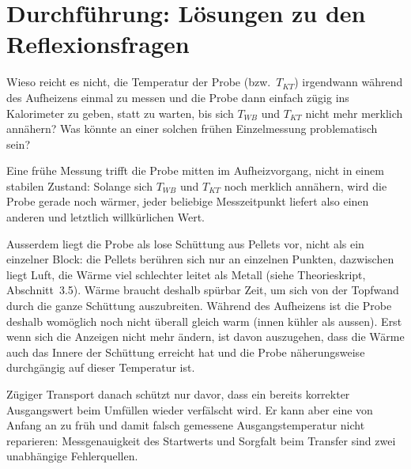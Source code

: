 \documentclass[11pt,a4paper]{article}
\newcommand{\Temp}{T}
\begin{document}
\section{Durchführung: Lösungen zu den Reflexionsfragen}

\begin{aufgabebox}
Wieso reicht es nicht, die Temperatur der Probe (bzw.\ $\Temp_{KT}$) irgendwann während des Aufheizens einmal zu messen und die Probe dann einfach zügig ins Kalorimeter zu geben, statt zu warten, bis sich $\Temp_{WB}$ und $\Temp_{KT}$ nicht mehr merklich annähern? Was könnte an einer solchen frühen Einzelmessung problematisch sein?
\end{aufgabebox}
\begin{loesungbox}
Eine frühe Messung trifft die Probe mitten im Aufheizvorgang, nicht in einem stabilen Zustand: Solange sich $\Temp_{WB}$ und $\Temp_{KT}$ noch merklich annähern, wird die Probe gerade noch wärmer, jeder beliebige Messzeitpunkt liefert also einen anderen und letztlich willkürlichen Wert.

Ausserdem liegt die Probe als lose Schüttung aus Pellets vor, nicht als ein einzelner Block: die Pellets berühren sich nur an einzelnen Punkten, dazwischen liegt Luft, die Wärme viel schlechter leitet als Metall (siehe Theorieskript, Abschnitt~3.5). Wärme braucht deshalb spürbar Zeit, um sich von der Topfwand durch die ganze Schüttung auszubreiten. Während des Aufheizens ist die Probe deshalb womöglich noch nicht überall gleich warm (innen kühler als aussen). Erst wenn sich die Anzeigen nicht mehr ändern, ist davon auszugehen, dass die Wärme auch das Innere der Schüttung erreicht hat und die Probe näherungsweise durchgängig auf dieser Temperatur ist.

Zügiger Transport danach schützt nur davor, dass ein bereits korrekter Ausgangswert beim Umfüllen wieder verfälscht wird. Er kann aber eine von Anfang an zu früh und damit falsch gemessene Ausgangstemperatur nicht reparieren: Messgenauigkeit des Startwerts und Sorgfalt beim Transfer sind zwei unabhängige Fehlerquellen.
\end{loesungbox}
\end{document}
